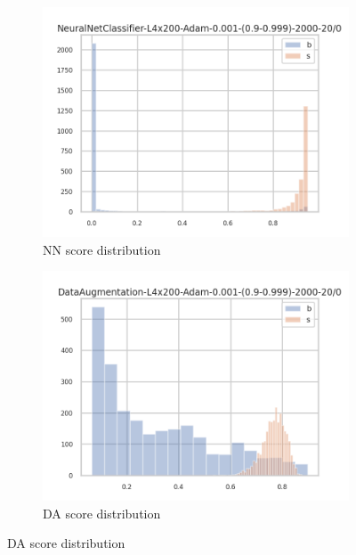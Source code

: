 \begin{figure}[ht!]
  \centering
  \begin{subfigure}[t]{0.49\linewidth}
    \includegraphics[width=\linewidth]{GG-prior/NeuralNetClassifier/valid_distrib.png}
    \caption{NN score distribution}
  \end{subfigure}%
  \hfill
  \begin{subfigure}[t]{0.49\linewidth}
    \includegraphics[width=\linewidth]{GG-prior/DataAugmentation/valid_distrib.png}
    \caption{DA score distribution}
  \end{subfigure}


\end{figure}

